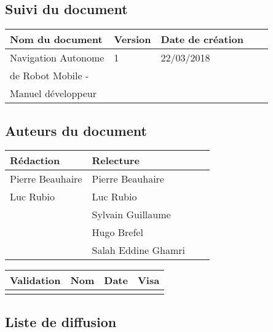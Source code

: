 \documentclass[10pt,a4paper]{article}
\begin{document}
\newpage


\subsection*{Suivi du document}

\begin{center}
    \begin{tabular}{| l | l | l | l | l |}
    \hline
     \rowcolor{gray} Nom du document & Version & Date de création \\ \hline
     Navigation Autonome & 1 & 22/03/2018 \\
     de Robot Mobile - & & \\
    Manuel développeur & & \\ \hline
    \end{tabular}
\end{center}


\subsection*{Auteurs du document}

\begin{center}
    \begin{tabular}{| l | l | l | l |}
    \hline
    \rowcolor{gray} Rédaction & Relecture \\ \hline
    Pierre Beauhaire & Pierre Beauhaire \\ 
    Luc Rubio & Luc Rubio \\ 
     & Sylvain Guillaume \\ 
     & Hugo Brefel \\ 
     & Salah Eddine Ghamri \\  \hline
    \end{tabular}
\end{center}

\begin{center}
    \begin{tabular}{| l | l | l | l |}
    \hline
     \rowcolor{gray} Validation & Nom & Date & Visa \\ \hline
    & & & \\
     \hline
    \end{tabular}
\end{center}

\subsection*{Liste de diffusion}
\end{document}
